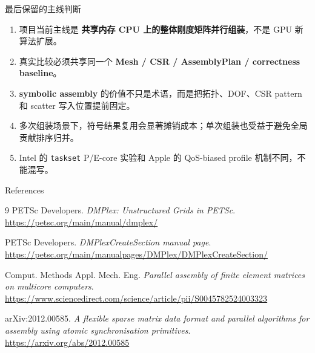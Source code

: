 \documentclass[UTF8,aspectratio=169,10pt]{ctexbeamer}
\newcommand{\term}[1]{\textcolor{pgsaBlue}{\textbf{#1}}}
\newcommand{\code}[1]{\texttt{#1}}
\begin{document}
\begin{frame}{最后保留的主线判断}
\begin{enumerate}
  \item 项目当前主线是 \term{共享内存 CPU 上的整体刚度矩阵并行组装}，不是 GPU 新算法扩展。
  \item 真实比较必须共享同一个 \term{Mesh / CSR / AssemblyPlan / correctness baseline}。
  \item \term{symbolic assembly} 的价值不只是术语，而是把拓扑、DOF、CSR pattern 和 scatter 写入位置提前固定。
  \item 多次组装场景下，符号结果复用会显著摊销成本；单次组装也受益于避免全局贡献排序归并。
  \item Intel 的 \code{taskset} P/E-core 实验和 Apple 的 QoS-biased profile 机制不同，不能混写。
\end{enumerate}
\vspace{0.4em}
\begin{center}
\end{center}
\end{frame}

\begin{frame}{References}
\small
\begin{thebibliography}{9}
PETSc Developers.
\newblock \emph{DMPlex: Unstructured Grids in PETSc}.
\newblock \url{https://petsc.org/main/manual/dmplex/}

PETSc Developers.
\newblock \emph{DMPlexCreateSection manual page}.
\newblock \url{https://petsc.org/main/manualpages/DMPlex/DMPlexCreateSection/}

Comput. Methods Appl. Mech. Eng.
\newblock \emph{Parallel assembly of finite element matrices on multicore computers}.
\newblock \url{https://www.sciencedirect.com/science/article/pii/S0045782524003323}

arXiv:2012.00585.
\newblock \emph{A flexible sparse matrix data format and parallel algorithms for assembly using atomic synchronisation primitives}.
\newblock \url{https://arxiv.org/abs/2012.00585}
\end{thebibliography}
\end{frame}
\end{document}
